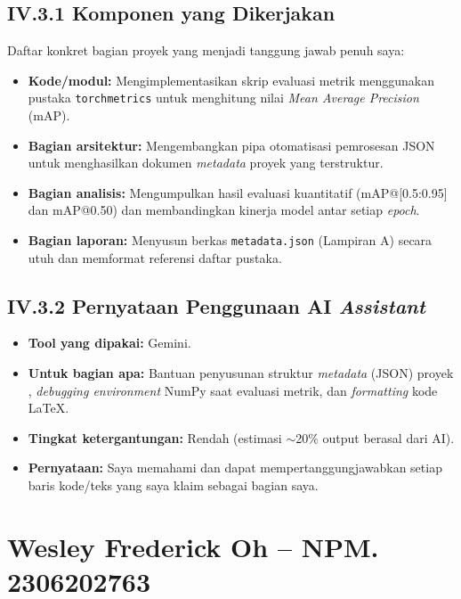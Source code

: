 \documentclass[11pt,a4paper,oneside]{report}
\begin{document}
\subsection*{IV.3.1 Komponen yang Dikerjakan}
Daftar konkret bagian proyek yang menjadi tanggung jawab penuh saya:
\begin{itemize}[leftmargin=*]
    \item \textbf{Kode/modul:} Mengimplementasikan skrip evaluasi metrik menggunakan pustaka \texttt{torchmetrics} untuk menghitung nilai \textit{Mean Average Precision} (mAP).
    \item \textbf{Bagian arsitektur:} Mengembangkan pipa otomatisasi pemrosesan JSON untuk menghasilkan dokumen \textit{metadata} proyek yang terstruktur.
    \item \textbf{Bagian analisis:} Mengumpulkan hasil evaluasi kuantitatif (mAP@[0.5:0.95] dan mAP@0.50) dan membandingkan kinerja model antar setiap \textit{epoch}.
    \item \textbf{Bagian laporan:} Menyusun berkas \texttt{metadata.json} (Lampiran A) secara utuh dan memformat referensi daftar pustaka.
\end{itemize}

\subsection*{IV.3.2 Pernyataan Penggunaan AI \textit{Assistant}}
\begin{itemize}[leftmargin=*]
    \item \textbf{Tool yang dipakai:} Gemini.
    \item \textbf{Untuk bagian apa:} Bantuan penyusunan struktur \textit{metadata} (JSON) proyek , \textit{debugging environment} NumPy saat evaluasi metrik, dan \textit{formatting} kode LaTeX.
    \item \textbf{Tingkat ketergantungan:} Rendah (estimasi $\sim$20\% output berasal dari AI).
    \item \textbf{Pernyataan:} Saya memahami dan dapat mempertanggungjawabkan setiap baris kode/teks yang saya klaim sebagai bagian saya.
\end{itemize}

\section{Wesley Frederick Oh -- NPM. 2306202763}
\end{document}
